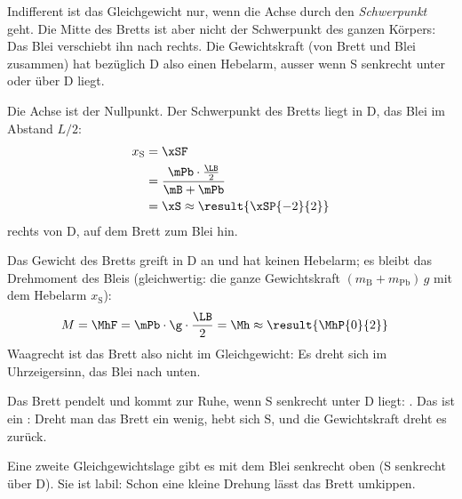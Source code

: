 \begin{abcliste}
\abc
Indifferent ist das Gleichgewicht nur, wenn die Achse durch den \emph{Schwerpunkt} geht. Die Mitte des Bretts ist aber nicht der Schwerpunkt des ganzen Körpers: Das Blei verschiebt ihn nach rechts. Die Gewichtskraft (von Brett und Blei zusammen) hat bezüglich D also einen Hebelarm, ausser wenn S senkrecht unter oder über D liegt.

\abc
Die Achse ist der Nullpunkt. Der Schwerpunkt des Bretts liegt in D, das Blei im Abstand $L/2$:
\begin{align}
 x_\mathrm{S} &= \xSF \\
   &= \frac{\mPb\cdot\frac{\LB}{2}}{\mB+\mPb} \\
   &= \xS \approx \result{\xSP{-2}{2}}
\end{align}
rechts von D, auf dem Brett zum Blei hin.

\abc
Das Gewicht des Bretts greift in D an und hat keinen Hebelarm; es bleibt das Drehmoment des Bleis (gleichwertig: die ganze Gewichtskraft $(m_\mathrm{B}+m_\mathrm{Pb})\,g$ mit dem Hebelarm $x_\mathrm{S}$):
\begin{align}
 M &= \MhF = \mPb\cdot\g\cdot\frac{\LB}{2} = \Mh \approx \result{\MhP{0}{2}}
\end{align}
Waagrecht ist das Brett also nicht im Gleichgewicht: Es dreht sich im Uhrzeigersinn, das Blei nach unten.

\abc
Das Brett pendelt und kommt zur Ruhe, wenn S senkrecht unter D liegt: . Das ist ein : Dreht man das Brett ein wenig, hebt sich S, und die Gewichtskraft dreht es zurück.

Eine zweite Gleichgewichtslage gibt es mit dem Blei senkrecht oben (S senkrecht über D). Sie ist labil: Schon eine kleine Drehung lässt das Brett umkippen.
\end{abcliste}
